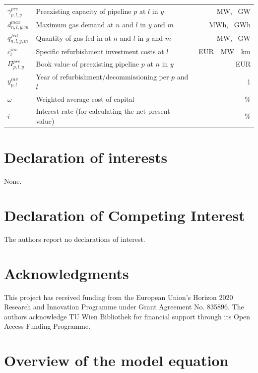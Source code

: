 \documentclass[review]{elsarticle}
\begin{document}
\begin{center}
\begin{tabular}{lm{7.75cm}r}
		\hline
		{$\gamma^{pre}_{p,l,y}$} & Preexisting capacity of pipeline $p$ at $l$ in $y$ & \SI{}{MW}, \SI{}{GW}\\
		{$d^{max}_{n,l,y,m}$} & Maximum gas demand at $n$ and $l$ in $y$ and $m$ & \SI{}{MWh}, \SI{}{GWh}\\
		{$q^{fed}_{n,l,y,m}$} & Quantity of gas fed in at $n$ and $l$ in $y$ and $m$ & \SI{}{MW}, \SI{}{GW}\\
		{$c^{inv}_{l}$} & Specific refurbishment investment costs at $l$  & \SI{}{EUR \per MW \per km}\\
		{$\Pi^{pre}_{p,l,y}$} & Book value of preexisting pipeline $p$ at $n$ in $y$& \SI{}{EUR}\\
		{$y^{inv}_{p,l}$} & Year of refurbishment/decommissioning per $p$ and $l$ & \SI{1}{}\\
		{$\omega$} & Weighted average cost of capital & \SI{}{\%}\\
		{$i$} & Interest rate (for calculating the net present value) & \SI{}{\%}\\
		\hline
	\end{tabular}
\end{center}
\newpage







\section*{Declaration of interests}
None.
\section*{Declaration of Competing Interest}
The authors report no declarations of interest.
\section*{Acknowledgments}
This project has received funding from the European Union's Horizon 2020 Research and Innovation Programme under Grant Agreement No. 835896. The authors acknowledge TU Wien Bibliothek for financial support through its Open Access Funding Programme.


\appendix
\setcounter{table}{0}
\setcounter{figure}{0}

\section{Overview of the model equation}\label{app_overview}
\end{document}
